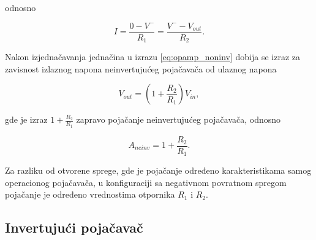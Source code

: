 {odnosno}

\begin{equation}
    I = \frac{0 - V^-}{R_1} = \frac{V^- - V_{out}}{R_2}.
    \label{eq:opamp_noninv}
\end{equation}

{Nakon izjednačavanja jednačina u izrazu \ref{eq:opamp_noninv} dobija se izraz za zavisnost izlaznog napona neinvertujućeg pojačavača od ulaznog napona}

\begin{equation}
    V_{out} = (1 + \frac{R_2}{R_1})V_{in},
\end{equation}

{gde je izraz $1 + \frac{R_2}{R_1}$ zapravo pojačanje neinvertujućeg pojačavača, odnosno}

\begin{equation}
    A_{neinv} = 1 + \frac{R_2}{R_1}.
\end{equation}

{Za razliku od otvorene sprege, gde je pojačanje određeno karakteristikama samog operacionog pojačavača, u konfiguraciji sa negativnom povratnom spregom pojačanje je određeno vrednostima otpornika $R_1$ i $R_2$.}

\subsection{Invertujući pojačavač}

